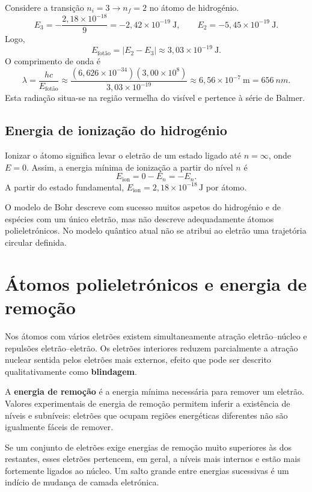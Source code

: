\documentclass[11pt,a4paper,oneside]{book}
\begin{document}
\begin{exemplo}[title={Exemplo resolvido -- a risca $H_\alpha$ da série de Balmer}]
Considere a transição $n_i=3\rightarrow n_f=2$ no átomo de hidrogénio.
\[
E_3=-\frac{2{,}18\times10^{-18}}{9}=-2{,}42\times10^{-19}\ \mathrm J,
\qquad
E_2=-5{,}45\times10^{-19}\ \mathrm J.
\]
Logo,
\[
E_{\text{fotão}}=|E_2-E_3|\approx3{,}03\times10^{-19}\ \mathrm J.
\]
O comprimento de onda é
\[
\lambda=\frac{hc}{E_{\text{fotão}}}
\approx\frac{(6{,}626\times10^{-34})(3{,}00\times10^8)}{3{,}03\times10^{-19}}
\approx6{,}56\times10^{-7}\ \mathrm m=\SI{656}{nm}.
\]
Esta radiação situa-se na região vermelha do visível e pertence à série de Balmer.
\end{exemplo}

\subsection*{Energia de ionização do hidrogénio}
Ionizar o átomo significa levar o eletrão de um estado ligado até $n=\infty$, onde $E=0$. Assim, a energia mínima de ionização a partir do nível $n$ é
\[
E_{\text{ion}}=0-E_n=-E_n.
\]
A partir do estado fundamental, $E_{\text{ion}}=2{,}18\times10^{-18}\,\mathrm J$ por átomo.

\begin{nota}
O modelo de Bohr descreve com sucesso muitos aspetos do hidrogénio e de espécies com um único eletrão, mas não descreve adequadamente átomos polieletrónicos. No modelo quântico atual não se atribui ao eletrão uma trajetória circular definida.
\end{nota}

\section{Átomos polieletrónicos e energia de remoção}
Nos átomos com vários eletrões existem simultaneamente atração eletrão--núcleo e repulsões eletrão--eletrão. Os eletrões interiores reduzem parcialmente a atração nuclear sentida pelos eletrões mais externos, efeito que pode ser descrito qualitativamente como \textbf{blindagem}.

A \textbf{energia de remoção} é a energia mínima necessária para remover um eletrão. Valores experimentais de energia de remoção permitem inferir a existência de níveis e subníveis: eletrões que ocupam regiões energéticas diferentes não são igualmente fáceis de remover.

\begin{exemplo}[title=Exemplo resolvido -- leitura qualitativa de energias de remoção]
Se um conjunto de eletrões exige energias de remoção muito superiores às dos restantes, esses eletrões pertencem, em geral, a níveis mais internos e estão mais fortemente ligados ao núcleo. Um salto grande entre energias sucessivas é um indício de mudança de camada eletrónica.
\end{exemplo}
\end{document}
